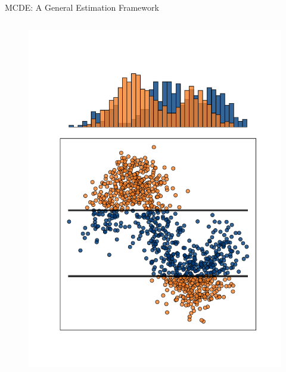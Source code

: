 \documentclass[16pt,usenames,dvipsnames, notheorems]{beamer}
\theoremstyle{definition}
\theoremstyle{example}
\theoremstyle{plain}
\begin{document}
\begin{frame}{MCDE: A General Estimation Framework}
\begin{center}
\begin{columns}
\begin{column}{0.38\textwidth}
\begin{center}
\begin{figure}
			\includegraphics[trim=1cm 1cm 1cm 1cm, width=0.45\linewidth]{figures/sine_2D_nomarginal-compressed.pdf}
		\end{figure}
	\end{center}
		

\end{column}
\end{columns}
\end{center}
\end{frame}
\end{document}

